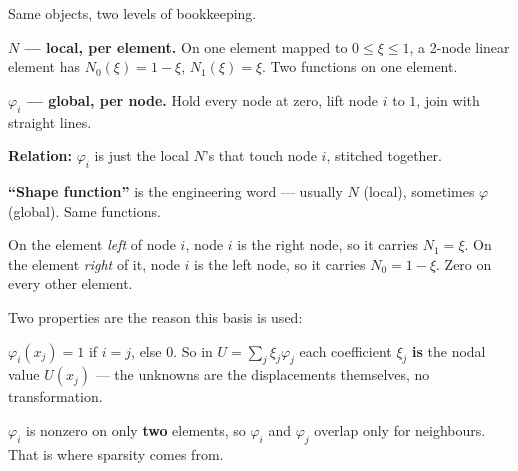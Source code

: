 \documentclass[11pt]{article}
\begin{document}
Same objects, two levels of bookkeeping.

\begin{pts}
\item \textbf{$N$ --- local, per element.} On one element mapped to
      $0\le\xi\le1$, a 2-node linear element has $N_0(\xi)=1-\xi$,
      $N_1(\xi)=\xi$. Two functions on one element.
\item \textbf{$\varphi_i$ --- global, per node.} Hold every node at zero, lift
      node $i$ to $1$, join with straight lines.
\item \textbf{Relation:} $\varphi_i$ is just the local $N$'s that touch node
      $i$, stitched together.
\item \textbf{``Shape function''} is the engineering word --- usually $N$
      (local), sometimes $\varphi$ (global). Same functions.
\end{pts}

\begin{center}
\par\smallskip
{\small On the element \emph{left} of node $i$, node $i$ is the right node, so
it carries $N_1=\xi$. On the element \emph{right} of it, node $i$ is the left
node, so it carries $N_0=1-\xi$. Zero on every other element.}
\end{center}

Two properties are the reason this basis is used:

\begin{pts}
\item $\varphi_i(x_j)=1$ if $i=j$, else $0$. So in $U=\sum_j\xi_j\varphi_j$ each
      coefficient $\xi_j$ \textbf{is} the nodal value $U(x_j)$ --- the unknowns
      are the displacements themselves, no transformation.
\item $\varphi_i$ is nonzero on only \textbf{two} elements, so $\varphi_i$ and
      $\varphi_j$ overlap only for neighbours. That is where sparsity comes from.
\end{pts}
\end{document}
